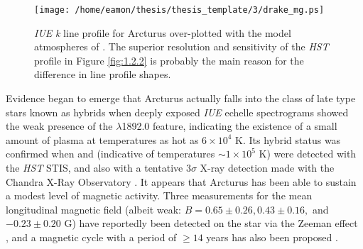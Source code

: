 \begin{figure}[t!]
\centering 
          \texttt{[image: /home/eamon/thesis/thesis\_template/3/drake\_mg.ps]}
\caption[\textit{IUE}  \textit{k} line and Drake models]{\textit{IUE}  \textit{k} line profile for Arcturus over-plotted with the model atmospheres of \cite{drake_1985}. The superior resolution and sensitivity of the \textit{HST} profile in Figure \ref{fig:1.2.2} is probably the main reason for the difference in line profile shapes.}
\label{fig:3.4.1}
\end{figure}

Evidence began to emerge that Arcturus actually falls into the class of late type stars known as hybrids when deeply exposed \textit{IUE} echelle spectrograms showed the weak presence of the \ion{Si}{iii]} $\lambda$1892.0 feature, indicating the existence of a small amount of plasma at temperatures as hot as $6 \times 10^4$ K. Its hybrid status was confirmed when  and  (indicative of temperatures $\sim 1 \times 10^5$ K) were detected with the \textit{HST} STIS, and also with a tentative $3 \sigma$ X-ray detection made with the  Chandra X-Ray Observatory \citep{ayres_2003}. It appears that Arcturus has been able to sustain a modest level of magnetic activity. Three measurements for the mean longitudinal magnetic field (albeit weak: $B = 0.65 \pm 0.26, 0.43 \pm 0.16,$ and $-0.23 \pm 0.20$ G) have reportedly been detected on the star via the Zeeman effect \citep{sennhauser_2011}, and a magnetic cycle with a period of $\geq 14$ years has also been proposed \citep{brown_2008}.

